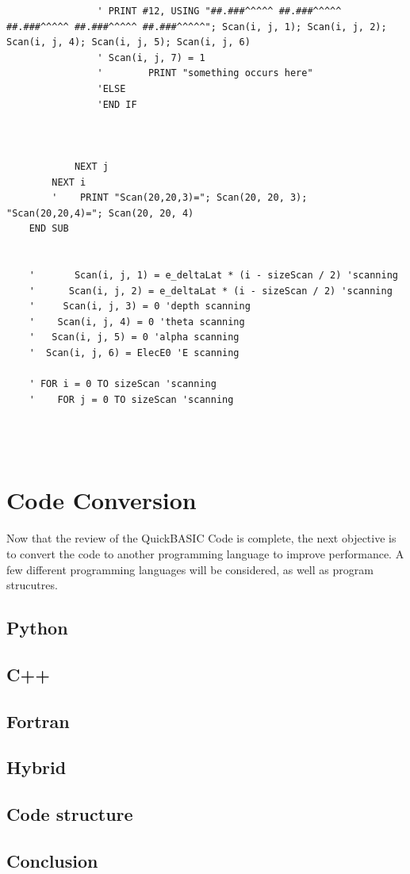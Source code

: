\documentclass[10pt, reqno]{exam}
\begin{document}
\begin{verbatim}
                ' PRINT #12, USING "##.###^^^^^ ##.###^^^^^ ##.###^^^^^ ##.###^^^^^ ##.###^^^^^"; Scan(i, j, 1); Scan(i, j, 2); Scan(i, j, 4); Scan(i, j, 5); Scan(i, j, 6)
                ' Scan(i, j, 7) = 1
                '        PRINT "something occurs here"
                'ELSE
                'END IF
    
    
    
            NEXT j
        NEXT i
        '    PRINT "Scan(20,20,3)="; Scan(20, 20, 3); "Scan(20,20,4)="; Scan(20, 20, 4)
    END SUB
    
    
    '       Scan(i, j, 1) = e_deltaLat * (i - sizeScan / 2) 'scanning
    '      Scan(i, j, 2) = e_deltaLat * (i - sizeScan / 2) 'scanning
    '     Scan(i, j, 3) = 0 'depth scanning
    '    Scan(i, j, 4) = 0 'theta scanning
    '   Scan(i, j, 5) = 0 'alpha scanning
    '  Scan(i, j, 6) = ElecE0 'E scanning
    
    ' FOR i = 0 TO sizeScan 'scanning
    '    FOR j = 0 TO sizeScan 'scanning


    
\end{verbatim}

\section{Code Conversion}

Now that the review of the QuickBASIC Code is complete, the next objective is to convert the code to another programming language to improve performance. A few different programming languages will be considered, as well as program strucutres.


\subsection{Python}

\subsection{C++}

\subsection{Fortran}

\subsection{Hybrid}

\subsection{Code structure}

\subsection{Conclusion}
\end{document}
